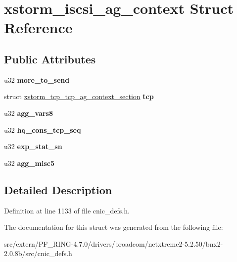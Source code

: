 \hypertarget{structxstorm__iscsi__ag__context}{
\section{xstorm\_\-iscsi\_\-ag\_\-context Struct Reference}
\label{structxstorm__iscsi__ag__context}
}
\subsection*{Public Attributes}
\begin{DoxyCompactItemize}
\item 
\hypertarget{structxstorm__iscsi__ag__context_aca960d228ee17362bfc5bbf6273fe8c2}{
u32 {\bfseries more\_\-to\_\-send}}
\label{structxstorm__iscsi__ag__context_aca960d228ee17362bfc5bbf6273fe8c2}

\item 
\hypertarget{structxstorm__iscsi__ag__context_a4d5403d7f95e8c60fd6a3972e3b1848f}{
struct \hyperlink{structxstorm__tcp__tcp__ag__context__section}{xstorm\_\-tcp\_\-tcp\_\-ag\_\-context\_\-section} {\bfseries tcp}}
\label{structxstorm__iscsi__ag__context_a4d5403d7f95e8c60fd6a3972e3b1848f}

\item 
\hypertarget{structxstorm__iscsi__ag__context_ac9cfb856a434fe585510a3a189556afb}{
u32 {\bfseries agg\_\-vars8}}
\label{structxstorm__iscsi__ag__context_ac9cfb856a434fe585510a3a189556afb}

\item 
\hypertarget{structxstorm__iscsi__ag__context_a00cb53f9aa7299152403fa9d6091e4ce}{
u32 {\bfseries hq\_\-cons\_\-tcp\_\-seq}}
\label{structxstorm__iscsi__ag__context_a00cb53f9aa7299152403fa9d6091e4ce}

\item 
\hypertarget{structxstorm__iscsi__ag__context_ad039f717fae1174de9f87e3276ddd833}{
u32 {\bfseries exp\_\-stat\_\-sn}}
\label{structxstorm__iscsi__ag__context_ad039f717fae1174de9f87e3276ddd833}

\item 
\hypertarget{structxstorm__iscsi__ag__context_a284a1c1515f9c6c15aaea5020982d841}{
u32 {\bfseries agg\_\-misc5}}
\label{structxstorm__iscsi__ag__context_a284a1c1515f9c6c15aaea5020982d841}

\end{DoxyCompactItemize}


\subsection{Detailed Description}


Definition at line 1133 of file cnic\_\-defs.h.



The documentation for this struct was generated from the following file:\begin{DoxyCompactItemize}
\item 
src/extern/PF\_\-RING-\/4.7.0/drivers/broadcom/netxtreme2-\/5.2.50/bnx2-\/2.0.8b/src/cnic\_\-defs.h\end{DoxyCompactItemize}
